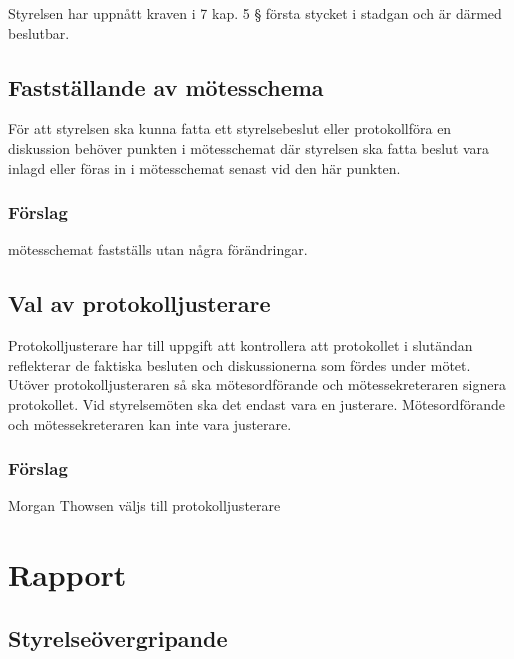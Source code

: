 \documentclass[protokoll]{dvd}
\begin{document}
\begin{attsatser}
    \item Styrelsen har uppnått kraven i 7 kap. 5 § första stycket i stadgan och är därmed beslutbar.
\end{attsatser}

\subsection{Fastställande av mötesschema}

För att styrelsen ska kunna fatta ett styrelsebeslut eller protokollföra en diskussion behöver punkten i mötesschemat där styrelsen ska fatta beslut vara inlagd eller föras in i mötesschemat senast vid den här punkten.

\subsubsection*{Förslag}

\begin{attsatser}
    \item mötesschemat fastställs utan några förändringar.
\end{attsatser}

\subsection{Val av protokolljusterare}

Protokolljusterare har till uppgift att kontrollera att protokollet i slutändan reflekterar de faktiska besluten och diskussionerna som fördes under mötet.
Utöver protokolljusteraren så ska mötesordförande och mötessekreteraren signera protokollet.
Vid styrelsemöten ska det endast vara en justerare.
Mötesordförande och mötessekreteraren kan inte vara justerare.

\subsubsection*{Förslag}
\begin{attsatser}
    \item Morgan Thowsen väljs till protokolljusterare
\end{attsatser}

\section{Rapport}

\subsection{Styrelseövergripande}
\end{document}
